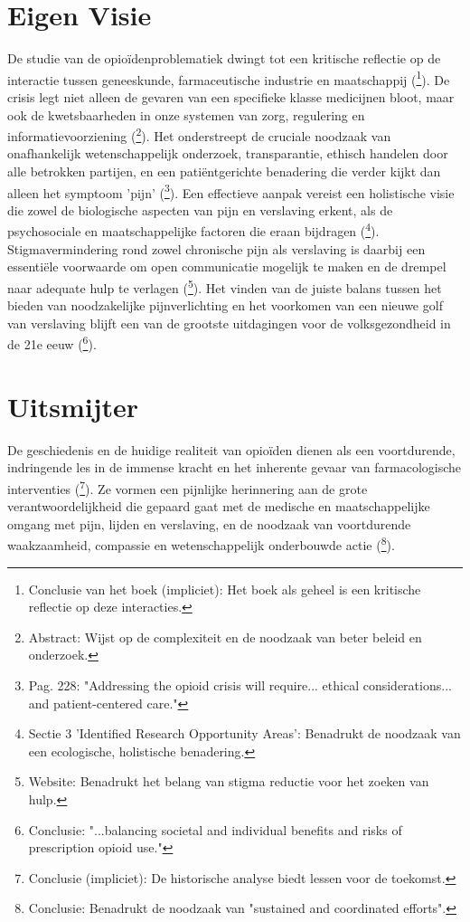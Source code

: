 \documentclass[11pt, a4paper]{report} %
\begin{document}
\section{Eigen Visie}
De studie van de opioïdenproblematiek dwingt tot een kritische reflectie op de interactie tussen geneeskunde, farmaceutische industrie en maatschappij (\cite{Macy2018Dopesick}\footnote{Conclusie van het boek (impliciet): Het boek als geheel is een kritische reflectie op deze interacties.}). De crisis legt niet alleen de gevaren van een specifieke klasse medicijnen bloot, maar ook de kwetsbaarheden in onze systemen van zorg, regulering en informatievoorziening (\cite{Schuler2020StateScienceOpioidPolicy}\footnote{Abstract: Wijst op de complexiteit en de noodzaak van beter beleid en onderzoek.}). Het onderstreept de cruciale noodzaak van onafhankelijk wetenschappelijk onderzoek, transparantie, ethisch handelen door alle betrokken partijen, en een patiëntgerichte benadering die verder kijkt dan alleen het symptoom 'pijn' (\cite{Volkow2021ChangingOpioidCrisis}\footnote{Pag. 228: "Addressing the opioid crisis will require... ethical considerations... and patient-centered care."}). Een effectieve aanpak vereist een holistische visie die zowel de biologische aspecten van pijn en verslaving erkent, als de psychosociale en maatschappelijke factoren die eraan bijdragen (\cite{Yarosh2020ComputationalSupportSUD}\footnote{Sectie 3 'Identified Research Opportunity Areas': Benadrukt de noodzaak van een ecologische, holistische benadering.}). Stigmavermindering rond zowel chronische pijn als verslaving is daarbij een essentiële voorwaarde om open communicatie mogelijk te maken en de drempel naar adequate hulp te verlagen (\cite{CDCStigmaReduction}\footnote{Website: Benadrukt het belang van stigma reductie voor het zoeken van hulp.}). Het vinden van de juiste balans tussen het bieden van noodzakelijke pijnverlichting en het voorkomen van een nieuwe golf van verslaving blijft een van de grootste uitdagingen voor de volksgezondheid in de 21e eeuw (\cite{Maclean2020EconomicStudiesOpioid}\footnote{Conclusie: "...balancing societal and individual benefits and risks of prescription opioid use."}).

\section{Uitsmijter}
De geschiedenis en de huidige realiteit van opioïden dienen als een voortdurende, indringende les in de immense kracht en het inherente gevaar van farmacologische interventies (\cite{CRS2022OpioidCrisisHistory}\footnote{Conclusie (impliciet): De historische analyse biedt lessen voor de toekomst.}). Ze vormen een pijnlijke herinnering aan de grote verantwoordelijkheid die gepaard gaat met de medische en maatschappelijke omgang met pijn, lijden en verslaving, en de noodzaak van voortdurende waakzaamheid, compassie en wetenschappelijk onderbouwde actie (\cite{Volkow2021ChangingOpioidCrisis}\footnote{Conclusie: Benadrukt de noodzaak van "sustained and coordinated efforts".}).
\end{document}
